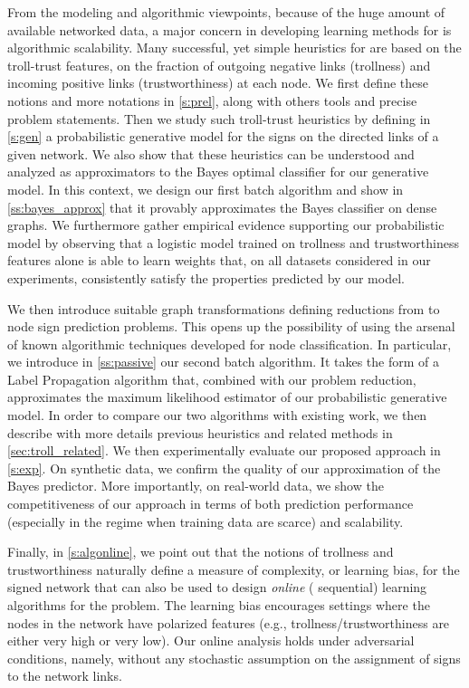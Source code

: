 From the modeling and algorithmic viewpoints, because of the huge amount of available networked
data, a major concern in developing learning methods for \esp{} is algorithmic
scalability. Many successful, yet simple heuristics for \esp{} are based on the
troll-trust features, \ie{} on the fraction of outgoing negative links (trollness) and incoming
positive links (trustworthiness) at each node. We first define these notions and more notations in
\autoref{s:prel}, along with others tools and precise problem statements. Then we study such
troll-trust heuristics by defining in \autoref{s:gen} a probabilistic
generative model for the signs on the directed links of a given network. We also show that these
heuristics can be understood and analyzed as approximators to the Bayes optimal classifier for our
generative model. In this context, we design our first batch algorithm and show in
\autoref{ss:bayes_approx} that it provably approximates the Bayes classifier on dense graphs.
We furthermore gather empirical evidence supporting our probabilistic model by observing
that a logistic model trained on trollness and trustworthiness features alone is able to learn
weights that, on all datasets considered in our experiments, consistently satisfy the properties
predicted by our model.

We then introduce suitable graph transformations defining reductions from \esp{} to
node sign prediction problems. This opens up the possibility of using the arsenal of known
algorithmic techniques developed for node classification. In particular, we introduce in
\autoref{ss:passive} our second batch algorithm. It takes the form of a Label
Propagation algorithm that, combined with our problem reduction, approximates the maximum likelihood
estimator of our probabilistic generative model.
In order to compare our two algorithms with existing work, we then describe with more details
previous heuristics and related methods in \autoref{sec:troll_related}.
We then experimentally evaluate our proposed approach in \autoref{s:exp}. On synthetic data, we
confirm the quality of our approximation of the Bayes predictor. More importantly, on real-world
data, we show the competitiveness of our approach in terms of both prediction performance
(especially in the regime when training data are scarce) and scalability.

Finally, in \autoref{s:algonline}, we point out that the notions of trollness and trustworthiness
naturally define a measure
of complexity, or learning bias, for the signed network that can also be used to design
\emph{online} (\ie{} sequential) learning algorithms for the \esp{} problem. The
learning bias encourages settings where the nodes in the network have polarized features (e.g.,
trollness/trustworthiness are either very high or very low). Our online analysis holds under
adversarial conditions, namely, without any stochastic assumption on the assignment of signs to the
network links.
